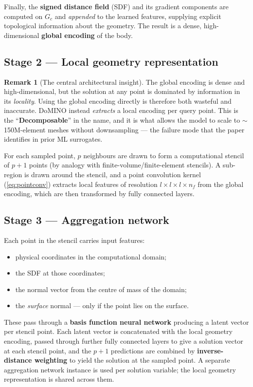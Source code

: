 \documentclass[10pt,a4paper]{article}
\theoremstyle{definition}
\newtheorem{remark}{Remark}[section]
\begin{document}
Finally, the \textbf{signed distance field} (SDF) and its gradient components are
computed on $G_c$ and \emph{appended} to the learned features, supplying explicit
topological information about the geometry. The result is a dense, high-dimensional
\textbf{global encoding} of the body.

\subsection{Stage 2 --- Local geometry representation}

\begin{remark}[The central architectural insight]
The global encoding is dense and high-dimensional, but the solution at any point is
dominated by information in its \emph{locality}. Using the global encoding directly
is therefore both wasteful and inaccurate. DoMINO instead \emph{extracts} a local
encoding per query point. This is the ``\textbf{Decomposable}'' in the name, and it
is what allows the model to scale to $\sim$150M-element meshes without downsampling
--- the failure mode that the paper identifies in prior ML surrogates.
\end{remark}

For each sampled point, $p$ neighbours are drawn to form a computational stencil of
$p+1$ points (by analogy with finite-volume/finite-element stencils). A sub-region
is drawn around the stencil, and a point convolution kernel (\cref{eq:pointconv})
extracts local features of resolution $l\times l\times l\times n_f$ from the global
encoding, which are then transformed by fully connected layers.

\subsection{Stage 3 --- Aggregation network}

Each point in the stencil carries input features:
\begin{itemize}
  \item physical coordinates in the computational domain;
  \item the SDF at those coordinates;
  \item the normal vector from the centre of mass of the domain;
  \item the \emph{surface} normal --- only if the point lies on the surface.
\end{itemize}

These pass through a \textbf{basis function neural network} producing a latent vector
per stencil point. Each latent vector is concatenated with the local geometry
encoding, passed through further fully connected layers to give a solution vector at
each stencil point, and the $p+1$ predictions are combined by \textbf{inverse-distance
weighting} to yield the solution at the sampled point. A separate aggregation network
instance is used per solution variable; the local geometry representation is shared
across them.
\end{document}
